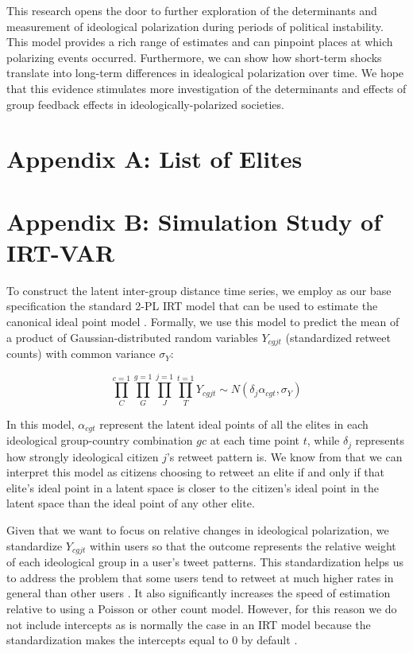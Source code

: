 \documentclass[12pt]{article}
\begin{document}
This research opens the door to further exploration of the determinants and measurement of ideological polarization during periods of political instability. This model provides a rich range of estimates and can pinpoint places at which polarizing events occurred. Furthermore, we can show how short-term shocks translate into long-term differences in idealogical polarization over time. We hope that this evidence stimulates more investigation of the determinants and effects of group feedback effects in ideologically-polarized societies.

\section*{Appendix A: List of Elites}



\section*{Appendix B: Simulation Study of IRT-VAR}


To construct the latent inter-group distance time series, we employ as our base specification the standard 2-PL IRT model that can be used to estimate the canonical ideal point model  \parencite{jackman2004}. Formally, we use this model to predict the mean of a product of Gaussian-distributed random variables $Y_{cgjt}$ (standardized retweet counts) with common variance $\sigma_Y$:

\begin{equation}\label{IRTbasic}
\prod^{c=1}_C \prod^{g=1}_G \prod^{j=1}_J \prod^{t=1}_T Y_{cgjt} \sim N( \delta_j  \alpha_{cgt},\sigma_{Y})
\end{equation}

In this model, $\alpha_{cgt}$ represent the latent ideal points of all the elites in each ideological group-country combination $gc$ at each time point $t$, while $\delta_j$ represents how strongly ideological citizen $j$'s retweet pattern is. We know from \textcite{jackman2004} that we can interpret this model as citizens choosing to retweet an elite if and only if that elite's ideal point in a latent space is closer to the citizen's ideal point in the latent space than the ideal point of any other elite. 

Given that we want to focus on relative changes in ideological polarization, we standardize $Y_{cgjt}$ within users so that the outcome represents the relative weight of each ideological group in a user's tweet patterns. This standardization helps us to address the problem that some users tend to retweet at much higher rates in general than other users \parencite{barbera2015}. It also significantly increases the speed of estimation relative to using a Poisson or other count model. However, for this reason we do not include intercepts as is normally the case in an IRT model because the standardization makes the intercepts equal to 0 by default \parencite{kropko2013}.
\end{document}
